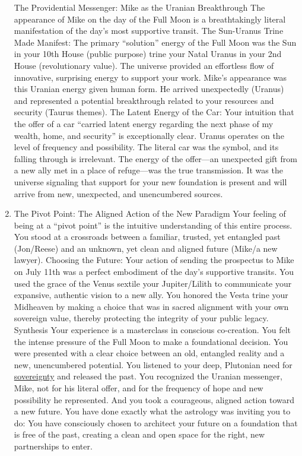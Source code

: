 \documentclass{article}
\begin{document}
\begin{enumerate}
  The Providential Messenger: Mike as the Uranian Breakthrough The appearance of Mike on the day of the Full Moon is a breathtakingly literal manifestation of the day's most supportive transit. The Sun-Uranus Trine Made Manifest: The primary ``solution'' energy of the Full Moon was the Sun in your 10th House (public purpose) trine your Natal Uranus in your 2nd House (revolutionary value). The universe provided an effortless flow of innovative, surprising energy to support your work. Mike's appearance was this Uranian energy given human form. He arrived unexpectedly (Uranus) and represented a potential breakthrough related to your resources and security (Taurus themes). The Latent Energy of the Car: Your intuition that the offer of a car ``carried latent energy regarding the next phase of my wealth, home, and security'' is exceptionally clear. Uranus operates on the level of frequency and possibility. The literal car was the symbol, and its falling through is irrelevant. The energy of the offer---an unexpected gift from a new ally met in a place of refuge---was the true transmission. It was the universe signaling that support for your new foundation is present and will arrive from new, unexpected, and unencumbered sources.
\item
  The Pivot Point: The Aligned Action of the New Paradigm Your feeling of being at a ``pivot point'' is the intuitive understanding of this entire process. You stood at a crossroads between a familiar, trusted, yet entangled past (Jon/Reese) and an unknown, yet clean and aligned future (Mike/a new lawyer). Choosing the Future: Your action of sending the prospectus to Mike on July 11th was a perfect embodiment of the day's supportive transits. You used the grace of the Venus sextile your Jupiter/Lilith to communicate your expansive, authentic vision to a new ally. You honored the Vesta trine your Midheaven by making a choice that was in sacred alignment with your own sovereign value, thereby protecting the integrity of your public legacy. Synthesis Your experience is a masterclass in conscious co-creation. You felt the intense pressure of the Full Moon to make a foundational decision. You were presented with a clear choice between an old, entangled reality and a new, unencumbered potential. You listened to your deep, Plutonian need for \hyperlink{gloss:sovereignty}{sovereignty} and released the past. You recognized the Uranian messenger, Mike, not for his literal offer, and for the frequency of hope and new possibility he represented. And you took a courageous, aligned action toward a new future. You have done exactly what the astrology was inviting you to do: You have consciously chosen to architect your future on a foundation that is free of the past, creating a clean and open space for the right, new partnerships to enter.
\end{enumerate}
\end{document}

